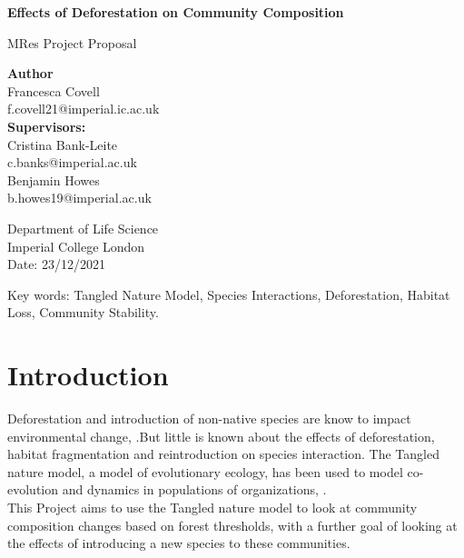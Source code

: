 \documentclass[11pt]{article}
\begin{document}
\begin{titlepage}
   \begin{center}
       \vspace*{1cm}
       \LARGE
       \textbf{Effects of Deforestation on Community Composition}

       \Large       
       MRes Project Proposal
            
       \vspace{1.5cm}
       \textbf{Author} \\
       Francesca Covell \\
       f.covell21@imperial.ic.ac.uk\\
       \vspace{0.8cm}
       \textbf{Supervisors:}\\
       Cristina Bank-Leite \\
       c.banks@imperial.ac.uk \\
       Benjamin Howes\\
       b.howes19@imperial.ac.uk\\
    \vfill
 
        Department of Life Science\\
        Imperial College London\\
        Date: 23/12/2021
            
   \end{center}
\end{titlepage}





Key words: Tangled Nature Model, Species Interactions,  Deforestation, Habitat   Loss, Community Stability.

\section{Introduction}

Deforestation and introduction of non-native species are know to impact environmental change, \autocite{Moslemi2012ImpactsIndies}.But little is known about the effects of deforestation, habitat fragmentation and reintroduction on species interaction\autocite{Hagen2012BiodiversityWorld}. The Tangled nature model, a model of evolutionary ecology, has been used to model co-evolution and dynamics in populations of organizations, \autocite{Christensen2002TangledEcology, Arthur2017TheEcology}.\\This Project aims to use the Tangled nature model to look at community composition changes based on forest thresholds, with a further goal of looking at the effects of introducing a new species to these communities.
\end{document}

